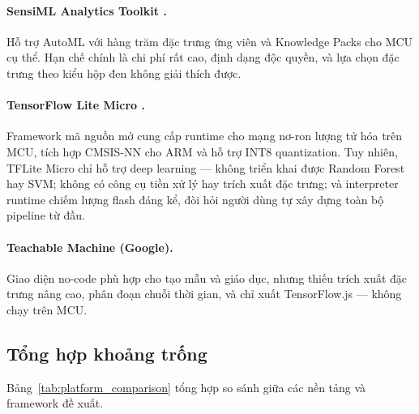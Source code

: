 \paragraph{SensiML Analytics Toolkit \cite{web:SensiML}.} Hỗ trợ AutoML với hàng trăm đặc trưng ứng viên và Knowledge Packs cho MCU cụ thể. Hạn chế chính là chi phí rất cao, định dạng độc quyền, và lựa chọn đặc trưng theo kiểu hộp đen không giải thích được.

\paragraph{TensorFlow Lite Micro \cite{david2020tensorflow}.} Framework mã nguồn mở cung cấp runtime cho mạng nơ-ron lượng tử hóa trên MCU, tích hợp CMSIS-NN cho ARM và hỗ trợ INT8 quantization. Tuy nhiên, TFLite Micro chỉ hỗ trợ deep learning --- không triển khai được Random Forest hay SVM; không có công cụ tiền xử lý hay trích xuất đặc trưng; và interpreter runtime chiếm lượng flash đáng kể, đòi hỏi người dùng tự xây dựng toàn bộ pipeline từ đầu.

\paragraph{Teachable Machine (Google).} Giao diện no-code phù hợp cho tạo mẫu và giáo dục, nhưng thiếu trích xuất đặc trưng nâng cao, phân đoạn chuỗi thời gian, và chỉ xuất TensorFlow.js --- không chạy trên MCU.

\subsection{Tổng hợp khoảng trống}

Bảng~\ref{tab:platform_comparison} tổng hợp so sánh giữa các nền tảng và framework đề xuất.


